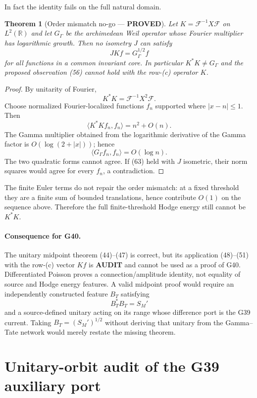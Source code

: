 \documentclass[11pt]{article}
\newtheorem{theorem}{Theorem}
\newcommand{\PROVED}{\textcolor{green!45!black}{\textbf{PROVED}}}
\newcommand{\AUDIT}{\textcolor{orange!75!black}{\textbf{AUDIT}}}
\begin{document}
In fact the identity fails on the full natural domain.

\begin{theorem}[Order mismatch no-go --- \PROVED]
Let $K=\mathcal F^{-1}X\mathcal F$ on $L^2(\mathbb R)$ and let
$G_\Gamma$ be the archimedean Weil operator whose Fourier multiplier has
logarithmic growth.  Then no isometry $J$ can satisfy
\begin{equation}
 J Kf=G_\Gamma^{1/2}f                              \tag{63}
\end{equation}
for all functions in a common invariant core.  In particular
$K^*K\ne G_\Gamma$ and the proposed observation (56) cannot hold with the
row-(c) operator $K$.
\end{theorem}

\begin{proof}
By unitarity of Fourier,
\[
 K^*K=\mathcal F^{-1}X^2\mathcal F.
\]
Choose normalized Fourier-localized functions $f_n$ supported where
$|x-n|\le1$.  Then
\[
 \langle K^*Kf_n,f_n\rangle=n^2+O(n).
\]
The Gamma multiplier obtained from the logarithmic derivative of the Gamma
factor is $O(\log(2+|x|))$; hence
\[
 \langle G_\Gamma f_n,f_n\rangle=O(\log n).
\]
The two quadratic forms cannot agree.  If (63) held with $J$ isometric, their
norm squares would agree for every $f_n$, a contradiction.
\end{proof}

The finite Euler terms do not repair the order mismatch: at a fixed threshold
they are a finite sum of bounded translations, hence contribute $O(1)$ on the
sequence above.  Therefore the full finite-threshold Hodge energy still cannot
be $K^*K$.

\paragraph{Consequence for G40.}
The unitary midpoint theorem (44)--(47) is correct, but its application
(48)--(51) with the row-(c) vector $Kf$ is \AUDIT{} and cannot be used as a
proof of G40.  Differentiated Poisson proves a connection/amplitude identity,
not equality of source and Hodge energy features.  A valid midpoint proof
would require an independently constructed feature $B_T$ satisfying
\[
 B_T^*B_T=S_M'
\]
and a source-defined unitary acting on its range whose difference port is the
G39 current.  Taking $B_T=(S_M')^{1/2}$ without deriving that unitary from the
Gamma--Tate network would merely restate the missing theorem.

\section{Unitary-orbit audit of the G39 auxiliary port}
\end{document}
